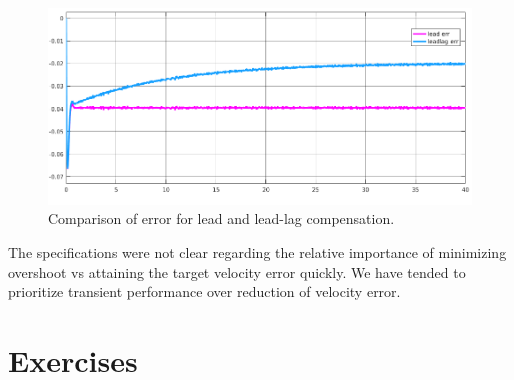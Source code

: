 \documentclass[11pt,a4paper]{article}
\begin{document}
\begin{figure}[!htbp]
	\includegraphics[width=\textwidth]{imglab/lab4sol_velerrleadvleadlag.png}
	\caption{Comparison of error for lead and lead-lag compensation.}
\end{figure}

The specifications were not clear regarding the relative importance of minimizing overshoot vs attaining the target velocity error quickly. We have tended to prioritize transient performance over reduction of velocity error.

\section{Exercises}
\end{document}

